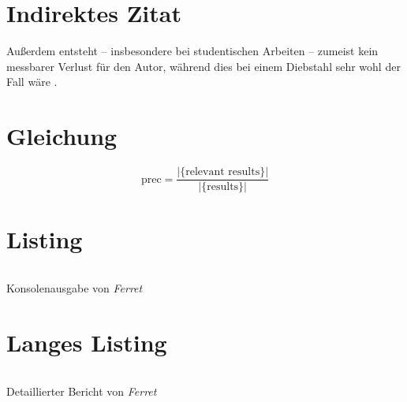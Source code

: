 \section{Indirektes Zitat}
Außerdem entsteht -- insbesondere bei studentischen Arbeiten -- zumeist kein messbarer Verlust für den Autor, während dies bei einem Diebstahl sehr wohl der Fall wäre .

\section{Gleichung}
\begin{equation}\label{eqn:prec}
    \mbox{prec}=\frac{|\{\mbox{relevant results}\}|}{|\{\mbox{results}\}|}
\end{equation}

\section{Listing}
\begin{listing}
    \inputminted{bat}{lst/ferret.txt}
    \caption{Konsolenausgabe von \emph{Ferret}}\label{lst:ferret}
\end{listing}

\section{Langes Listing}
\begin{longlisting}
    \inputminted{xml}{lst/ferret.xml}
    \caption{Detaillierter Bericht von \emph{Ferret}}\label{lst:ferretXml}
\end{longlisting}